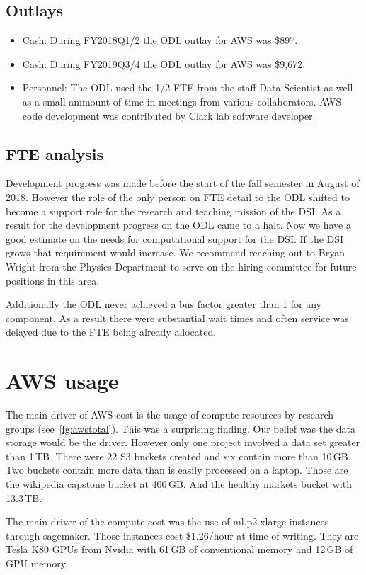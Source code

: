 \subsection{Outlays}
\begin{itemize}
\item Cash: During FY2018Q1/2 the ODL outlay for AWS was \$897.
\item Cash: During FY2019Q3/4 the ODL outlay for AWS was \$9,672.
\item Personnel: The ODL used the 1/2 FTE from the staff Data Scientist as well as a small ammount of time in meetings from various collaborators. AWS code development was contributed by Clark lab software developer.
\end{itemize}


\subsection{FTE analysis}
Development progress was made before the start of the fall semester in August of 2018. However the role of the only person on FTE detail to the ODL shifted to become a support role for the research and teaching mission of the DSI. As a result for the development progress on the ODL came to a halt. Now we have a good estimate on the needs for computational support for the DSI. If the DSI grows that requirement would increase. We recommend reaching out to Bryan Wright from the Physics Department to serve on the hiring committee for future positions in this area.

Additionally the ODL never achieved a bus factor greater than 1 for any component. As a result there were substantial wait times and often service was delayed due to the FTE being already allocated.

\section{AWS usage}
The main driver of AWS cost is the usage of compute resources by research groups (see~\ref{fg:awstotal}). This was a surprising finding. Our belief was the data storage would be the driver. However only one project involved a data set greater than 1\,TB.
There were 22 S3 buckets created and six contain more than 10\,GB. Two buckets contain more data than is easily processed on a laptop. Those are the wikipedia capstone bucket at 400\,GB. And the healthy markets bucket with 13.3\,TB.

The main driver of the compute cost was the use of ml.p2.xlarge instances through sagemaker. Those instances cost \$1.26/hour at time of writing. They are Tesla K80 GPUs from Nvidia with 61\,GB of conventional memory and 12\,GB of GPU memory.

